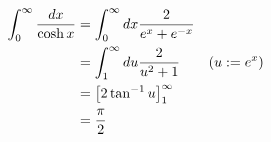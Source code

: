 \item

\begin{align*}
	\int_0^\infty \frac{dx}{\cosh x}
	 & = \int_0^\infty dx \frac{2}{e^x + e^{-x}}              \\
	 & = \int_1^\infty du \frac{2}{u^2 + 1}      & (u := e^x) \\
	 & = {\left[ 2\tan^{-1} u \right]_{1}^{\infty}}                \\
	 & = \frac{\pi}{2}
\end{align*}